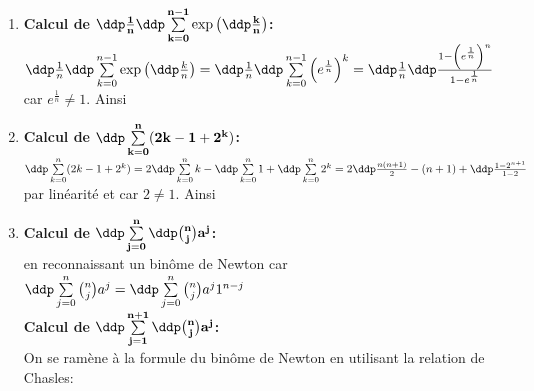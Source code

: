 \begin{correction}
\begin{enumerate}
\item  \textbf{Calcul de $\mathbf{\ddp\frac{1}{n}\ddp \sum\limits_{k=0}^{n-1} \exp{\left(\ddp\frac{k}{n}\right)} }$:}\\
\noindent $\ddp\frac{1}{n}\ddp \sum\limits_{k=0}^{n-1} \exp{\left(\ddp\frac{k}{n}\right)} = \ddp\frac{1}{n}\ddp \sum\limits_{k=0}^{n-1} \left( e^{\frac{1}{n}} \right)^{k}=\ddp\frac{1}{n} \ddp\frac{ 1-\left( e^{\frac{1}{n}} \right)^{n}  }{1-e^{\frac{1}{n}} }$ car $e^{\frac{1}{n}} \not= 1$. Ainsi  


\item  \textbf{Calcul de $\mathbf{\ddp \sum\limits_{k=0}^n (2k-1+2^k) }$:}\\
\noindent $\ddp \sum\limits_{k=0}^n (2k-1+2^k)=2\ddp \sum\limits_{k=0}^n k-\ddp \sum\limits_{k=0}^n 1+\ddp \sum\limits_{k=0}^n 2^k=2\ddp\frac{n(n+1)}{2} -(n+1)+ \ddp\frac{1-2^{n+1}}{1-2}$ par  lin\'earit\'e et car $2\not=1$. Ainsi 
\item  \textbf{Calcul de $\mathbf{\ddp \sum\limits_{j=0}^n\ddp \binom{n}{j}a^j}$:}\\
\noindent {} en reconnaissant un bin\^{o}me de Newton car $\ddp \sum\limits_{j=0}^n\binom{n}{j}a^j=\ddp \sum\limits_{j=0}^n\binom{n}{j}a^j 1^{n-j}$\\
\noindent  \textbf{Calcul de $\mathbf{\ddp \sum\limits_{j=1}^{n+1}\ddp \binom{n}{j}a^j}$:}\\
\noindent On se ram\`{e}ne \`{a} la formule du bin\^{o}me de Newton en utilisant la relation de Chasles: 

\end{enumerate}
\end{correction}
